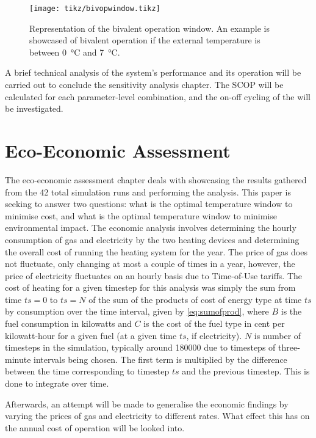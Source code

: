 \begin{figure}[htb]
    \centering
    \texttt{[image: tikz/bivopwindow.tikz]}
    \caption{Representation of the bivalent operation window. An example is showcased of bivalent operation if the external temperature is between \qty{0}{\celsius} and \qty{7}{\celsius}.}
    \label{fig:bivopwindow}
\end{figure}

A brief technical analysis of the system's performance and its operation will be carried out to conclude the sensitivity analysis chapter. The \ac{SCOP} will be calculated for each parameter-level combination, and the on-off cycling of the \HP will be investigated.

\section{Eco-Economic Assessment}\label{sec:methodecoeco}
The eco-economic assessment chapter deals with showcasing the results gathered from the 42 total simulation runs and performing the analysis. This paper is seeking to answer two questions: what is the optimal temperature window to minimise cost, and what is the optimal temperature window to minimise environmental impact. The economic analysis involves determining the hourly consumption of gas and electricity by the two heating devices and determining the overall cost of running the heating system for the year. The price of gas does not fluctuate, only changing at most a couple of times in a year, however, the price of electricity fluctuates on an hourly basis due to Time-of-Use tariffs. The cost of heating for a given timestep for this analysis was simply the sum from time $\mathit{ts}=0$ to $\mathit{ts}=N$ of the sum of the products of cost of energy type at time $\mathit{ts}$ by consumption over the time interval, given by \cref{eq:sumofprod}, where $B$ is the fuel consumption in kilowatts and $C$ is the cost of the fuel type in cent per kilowatt-hour for a given fuel (at a given time $\mathit{ts}$, if electricity). $N$ is number of timesteps in the simulation, typically around \num{180000} due to timesteps of three-minute intervals being chosen. The first term is multiplied by the difference between the time corresponding to timestep $\mathit{ts}$ and the previous timestep. This is done to integrate over time. 

Afterwards, an attempt will be made to generalise the economic findings by varying the prices of gas and electricity to different rates. What effect this has on the annual cost of operation will be looked into.

